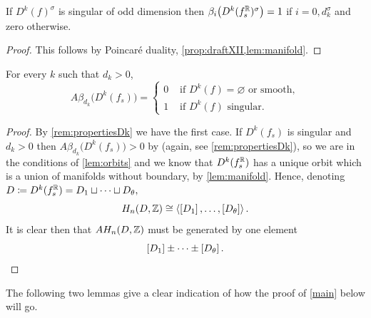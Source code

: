 \documentclass[a4paper,12pt]{amsart}
\begin{document}
\begin{corollary}\label{cor:oddDk}
If $D^k(f)^\sigma$ is singular of odd dimension then $\beta_i\big(D^k(f_s^{\mathbb{R}})^\sigma\big)=1$ if $i=0,d_k^\sigma$ and zero otherwise.
\end{corollary}
\begin{proof}
This follows by Poincaré duality, \cref{prop:draftXII,lem:manifold}.
\end{proof}

\begin{theorem}\label{thm:bettialtis1}
For every $k$ such that $d_k>0$,
\[A\beta_{d_k}\big( D^k(f_s)\big)=\begin{cases}
0 &\text{ if } D^k(f)=\varnothing \text{ or smooth},\\
1 &\text{ if } D^k(f) \text{ singular}.
\end{cases}\]
\end{theorem}
\begin{proof}
By \cref{rem:propertiesDk} we have the first case. If $D^k(f_s)$ is singular and $d_k>0$ then $A\beta_{d_k}\big(D^k(f_s)\big)>0$ by \cite[Theorem 4.8]{GimenezConejero2022c} (again, see \cref{rem:propertiesDk}), so we are in the conditions of \cref{lem:orbits} and we know that $D^k(f_s^{\mathbb{R}})$ has a unique orbit which is a union of manifolds without boundary, by \cref{lem:manifold}. Hence, denoting $D\coloneqq D^k(f_s^{\mathbb{R}})=D_1\sqcup\dots\sqcup D_\theta,$
\[H_n(D,\mathbb{Z})\cong\left\langle \left[D_1\right],\dots,\left[D_\theta\right]\right\rangle .\]
It is clear then that $AH_n(D,\mathbb{Z})$ must be generated by one element
\[ %
\left[D_1\right]\pm\dots\pm\left[D_\theta\right].\qedhere\]
\end{proof}


The following two lemmas give a clear indication of how the proof of \cref{main} below will go.
\end{document}
